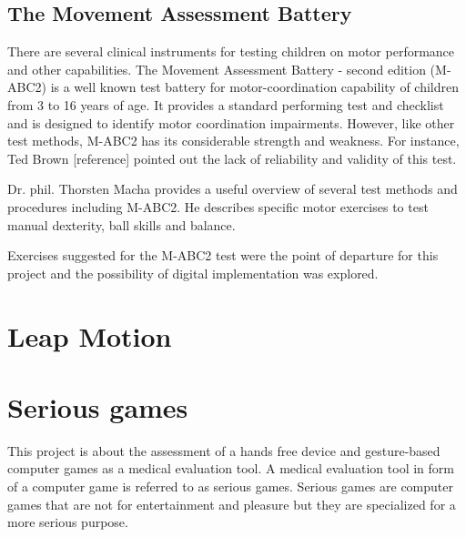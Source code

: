 \subsection{The Movement Assessment Battery}
There are several clinical instruments for testing children on motor performance and other capabilities. The Movement Assessment Battery - second edition (M-ABC2) is a well known test battery for motor-coordination capability of children from 3 to 16 years of age. It provides a standard performing test and checklist and is designed to identify motor coordination impairments. However, like other test methods, M-ABC2 has its considerable strength and weakness. For instance, Ted Brown [reference] pointed out the lack of reliability and validity of this test.

Dr. phil. Thorsten Macha provides a useful overview of several test methods and procedures including M-ABC2. He describes specific motor exercises to test manual dexterity, ball skills and balance. 

Exercises suggested for the M-ABC2 test were the point of departure for this project and the possibility of digital implementation was explored.






\section{Leap Motion}
\label{sec:leapmotion}
\section{Serious games}
\label{sec:seriousgames}
This project is about the assessment of a hands free device and gesture-based computer games as a medical evaluation tool. A medical evaluation tool in form of a computer game is referred to as serious games. Serious games are computer games that are not for entertainment and pleasure but they are specialized for a more serious purpose. 

